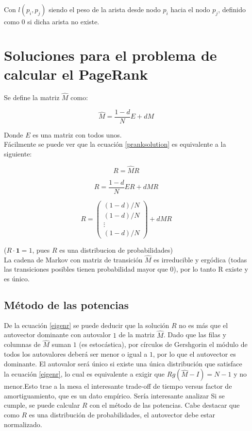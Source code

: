 \documentclass[%
    final,
    notitlepage,
    narroweqnarray,
    inline,
    twoside,
    invited
    ]{lib/ieee}
\begin{document}
Con $l(p_{i},p_{j})$ siendo el peso de la arista desde nodo $p_{i}$ hacia el nodo $p_{j}$, definido como $0$ si dicha arista no existe.\\

\section{Soluciones para el problema de calcular el PageRank}

Se define la matriz $\widehat{M}$ como:

\begin{equation}\label{mhat}
\widehat{M} = \frac{1-d}{N}E + dM
\end{equation}

Donde $E$ es una matriz con todos unos.\\

Fácilmente se puede ver que la ecuación \eqref{pranksolution} es equivalente a la siguiente:

\begin{equation}\label{eigenr}
R = \widehat{M}R
\end{equation}

\[
    R = \frac{1-d}{N}ER + dMR
\]

\[
    R = \begin{pmatrix}
            (1-d)/N \\ (1-d)/N \\ \vdots \\ (1-d)/N
        \end{pmatrix} + dMR
\]

($R \cdot \mathbf 1 = 1$, pues $R$ es una distribucion de probabilidades)\\

La cadena de Markov con matriz de transición $\widehat{M}$ es irreducible y ergódica (todas las transiciones posibles tienen probabilidad mayor
que $0$), por lo tanto R existe y es único.

\subsection{Método de las potencias}

De la ecuación \eqref{eigenr} se puede deducir que la solución $R$ no es más que el autovector dominante con autovalor $1$ de la matriz $\widehat{M}$.
Dado que las filas y columnas de
$\widehat{M}$ suman $1$ (es estocástica), por círculos de Gershgorin el módulo de todos los autovalores deberá ser menor o igual a $1$, por lo que el autovector
es dominante. El autovalor será único si existe una única distribución que satisface la ecuación \eqref{eigenr}, lo cual es equivalente a exigir
que $Rg\left(\widehat{M}-I\right) = N-1$ y no menor.Esto trae a la mesa el interesante trade-off de tiempo versus factor de amortiguamiento, que es un dato empírico. Sería interesante analizar
Si se cumple, se puede calcular $R$ con el método de las potencias. Cabe destacar que como
$R$ es una distribución de probabilidades, el autovector debe estar normalizado.\\
\end{document}
